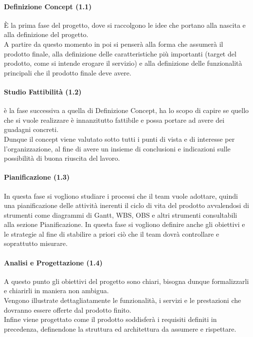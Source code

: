 \paragraph{Definizione Concept (1.1)}
\`{E} la prima fase del progetto, dove si raccolgono le idee che portano alla nascita e alla definizione del progetto.\\
A partire da questo momento in poi si penser\`{a} alla forma che assumer\`{a} il prodotto finale, alla  definizione delle caratteristiche pi\`{u} importanti (target del prodotto, come si intende erogare il servizio) e alla definizione delle funzionalit\`{a} principali che il prodotto finale deve avere.

\paragraph{Studio Fattibilit\`{a} (1.2)}
\`{e} la fase successiva a quella di Definizione Concept, ha lo scopo di capire se quello che si vuole realizzare \`{e} innanzitutto fattibile e possa portare ad avere dei guadagni concreti.\\
Dunque il concept viene valutato sotto tutti i punti di vista e di interesse per l'organizzazione, al fine di avere un insieme di conclusioni e indicazioni sulle possibilit\`{a} di buona riuscita del lavoro.

\paragraph{Pianificazione (1.3)}
In questa fase si vogliono studiare i processi che il team vuole adottare, quindi una pianificazione delle attivit\`{a} inerenti il ciclo di vita del prodotto avvalendosi di strumenti come diagrammi di Gantt, WBS, OBS e altri strumenti consultabili alla sezione Pianificazione. In questa fase si vogliono definire anche gli obiettivi e le strategie al fine di stabilire a priori ci\`{o} che il team dovr\`{a} controllare e soprattutto misurare.

\paragraph{Analisi e Progettazione (1.4)}
A questo punto gli obiettivi del progetto sono chiari, bisogna dunque formalizzarli e chiarirli in maniera non ambigua.\\
Vengono illustrate dettagliatamente le funzionalit\`{a}, i servizi e le prestazioni che dovranno essere offerte dal prodotto finito.\\
Infine viene progettato come il prodotto soddisfer\`{a} i requisiti definiti in precedenza, definendone la struttura ed architettura da assumere e rispettare.

